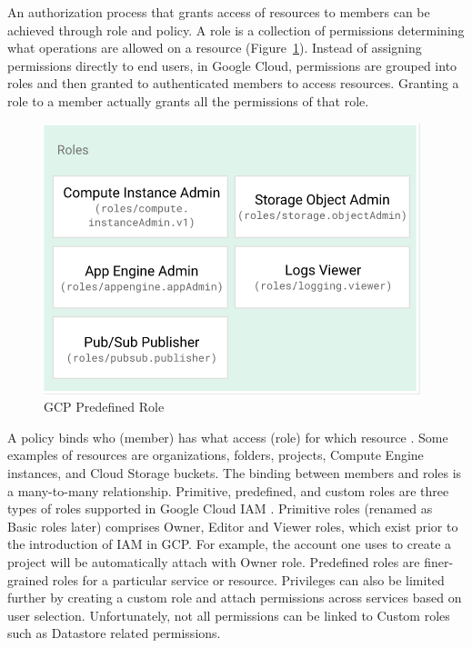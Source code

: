 An authorization process that grants access of resources to members can be achieved through role and policy. A role is a collection of permissions determining what operations are allowed on a resource (Figure~\ref{fig:role}). Instead of assigning permissions directly to end users, in Google Cloud, permissions are grouped into roles and then granted to authenticated members to access resources. Granting a role to a member actually grants all the permissions of that role.
\begin{figure}[!h]
  \centering
  \includegraphics[width=\linewidth]{pic/role}
  \caption {GCP Predefined Role}
  \label{fig:role}
\end{figure}
A policy binds who (member) has what access (role) for which resource \cite{Googlecloudiam}. Some examples of resources are organizations, folders, projects, Compute Engine instances, and Cloud Storage buckets. The binding between members and roles is a many-to-many relationship.
Primitive, predefined, and custom roles are three types of roles supported in Google Cloud IAM \cite{googlecloudrole}. Primitive roles (renamed as Basic roles later) comprises Owner, Editor and Viewer roles, which exist prior to the introduction of IAM in GCP. For example, the account one uses to create a project will be automatically attach with Owner role. Predefined roles are finer-grained roles for a particular service or resource. Privileges can also be limited further by creating a custom role and attach permissions across services based on user selection. Unfortunately, not all permissions can be linked to Custom roles such as Datastore related permissions. 

